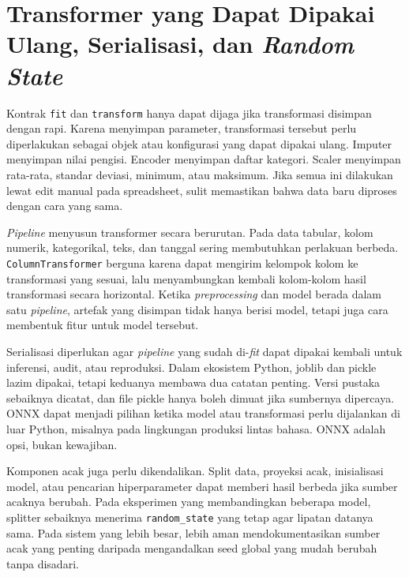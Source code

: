 \section{\texorpdfstring{Transformer yang Dapat Dipakai Ulang, Serialisasi, dan \emph{Random State}}{Transformer yang Dapat Dipakai Ulang, Serialisasi, dan Random State}}\label{transformer-yang-dapat-dipakai-ulang-serialisasi-dan-random-state}

Kontrak \passthrough{\lstinline!fit!} dan \passthrough{\lstinline!transform!} hanya dapat dijaga jika transformasi disimpan dengan rapi. Karena menyimpan parameter, transformasi tersebut perlu diperlakukan sebagai objek atau konfigurasi yang dapat dipakai ulang. Imputer menyimpan nilai pengisi. Encoder menyimpan daftar kategori. Scaler menyimpan rata-rata, standar deviasi, minimum, atau maksimum. Jika semua ini dilakukan lewat edit manual pada spreadsheet, sulit memastikan bahwa data baru diproses dengan cara yang sama.

\emph{Pipeline} menyusun transformer secara berurutan. Pada data tabular, kolom numerik, kategorikal, teks, dan tanggal sering membutuhkan perlakuan berbeda. \passthrough{\lstinline!ColumnTransformer!} berguna karena dapat mengirim kelompok kolom ke transformasi yang sesuai, lalu menyambungkan kembali kolom-kolom hasil transformasi secara horizontal. Ketika \emph{preprocessing} dan model berada dalam satu \emph{pipeline}, artefak yang disimpan tidak hanya berisi model, tetapi juga cara membentuk fitur untuk model tersebut.

Serialisasi diperlukan agar \emph{pipeline} yang sudah di-\emph{fit} dapat dipakai kembali untuk inferensi, audit, atau reproduksi. Dalam ekosistem Python, joblib dan pickle lazim dipakai, tetapi keduanya membawa dua catatan penting. Versi pustaka sebaiknya dicatat, dan file pickle hanya boleh dimuat jika sumbernya dipercaya. ONNX dapat menjadi pilihan ketika model atau transformasi perlu dijalankan di luar Python, misalnya pada lingkungan produksi lintas bahasa. ONNX adalah opsi, bukan kewajiban.

Komponen acak juga perlu dikendalikan. Split data, proyeksi acak, inisialisasi model, atau pencarian hiperparameter dapat memberi hasil berbeda jika sumber acaknya berubah. Pada eksperimen yang membandingkan beberapa model, splitter sebaiknya menerima \passthrough{\lstinline!random_state!} yang tetap agar lipatan datanya sama. Pada sistem yang lebih besar, lebih aman mendokumentasikan sumber acak yang penting daripada mengandalkan seed global yang mudah berubah tanpa disadari.

